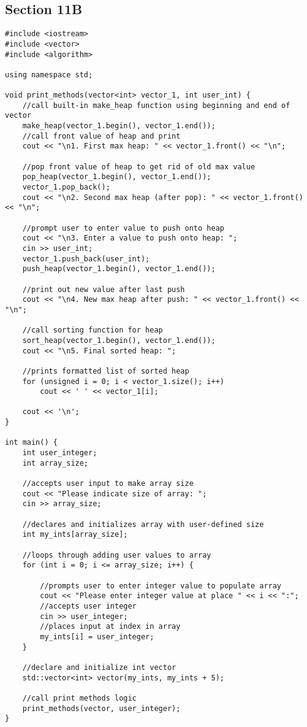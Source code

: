 \documentclass[11pt]{article}
\begin{document}
\subsection*{Section 11B}
\begin{lstlisting}
#include <iostream>
#include <vector>
#include <algorithm>

using namespace std;

void print_methods(vector<int> vector_1, int user_int) {
    //call built-in make_heap function using beginning and end of vector
    make_heap(vector_1.begin(), vector_1.end());
    //call front value of heap and print
    cout << "\n1. First max heap: " << vector_1.front() << "\n";

    //pop front value of heap to get rid of old max value
    pop_heap(vector_1.begin(), vector_1.end());
    vector_1.pop_back();
    cout << "\n2. Second max heap (after pop): " << vector_1.front() << "\n";

    //prompt user to enter value to push onto heap
    cout << "\n3. Enter a value to push onto heap: ";
    cin >> user_int;
    vector_1.push_back(user_int);
    push_heap(vector_1.begin(), vector_1.end());

    //print out new value after last push
    cout << "\n4. New max heap after push: " << vector_1.front() << "\n";

    //call sorting function for heap
    sort_heap(vector_1.begin(), vector_1.end());
    cout << "\n5. Final sorted heap: ";

    //prints formatted list of sorted heap
    for (unsigned i = 0; i < vector_1.size(); i++)
        cout << ' ' << vector_1[i];

    cout << '\n';
}

int main() {
    int user_integer;
    int array_size;

    //accepts user input to make array size
    cout << "Please indicate size of array: ";
    cin >> array_size;

    //declares and initializes array with user-defined size
    int my_ints[array_size];

    //loops through adding user values to array
    for (int i = 0; i <= array_size; i++) {

        //prompts user to enter integer value to populate array
        cout << "Please enter integer value at place " << i << ":";
        //accepts user integer
        cin >> user_integer;
        //places input at index in array
        my_ints[i] = user_integer;
    }

    //declare and initialize int vector
    std::vector<int> vector(my_ints, my_ints + 5);

    //call print methods logic
    print_methods(vector, user_integer);
}

\end{lstlisting}
\end{document}
